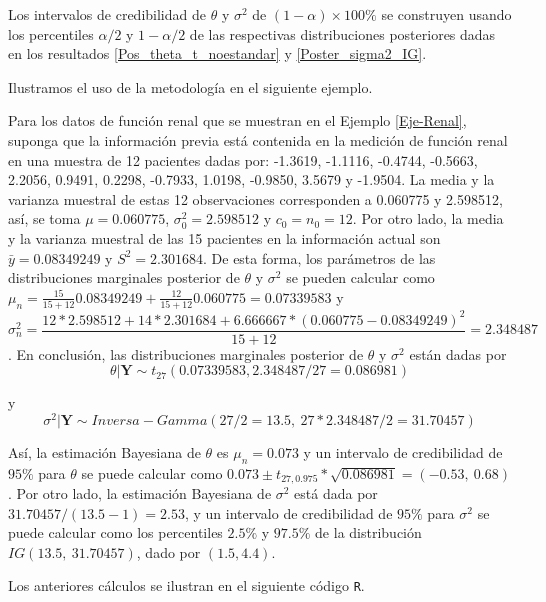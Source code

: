 Los intervalos de credibilidad de $\theta$ y $\sigma^2$ de $(1-\alpha)\times 100\%$ se construyen usando los percentiles $\alpha/2$ y $1-\alpha/2$ de las respectivas distribuciones posteriores dadas en los resultados \ref{Pos_theta_t_noestandar} y \ref{Poster_sigma2_IG}.

Ilustramos el uso de la metodología en el siguiente ejemplo.

\begin{Eje}\label{Eje2.1.2}
Para los datos de función renal \cite{Efronims} que se muestran en el Ejemplo \ref{Eje-Renal}, suponga que la información previa está contenida en la medición de función renal en una muestra de 12 pacientes dadas por: -1.3619, -1.1116, -0.4744, -0.5663, 2.2056, 0.9491, 0.2298, -0.7933, 1.0198, -0.9850, 3.5679 y -1.9504. La media y la varianza muestral de estas 12 observaciones corresponden a 0.060775 y 2.598512, así, se toma $\mu=0.060775$, $\sigma^2_0=2.598512$ y $c_0=n_0=12$. Por otro lado, la media y la varianza muestral de las 15 pacientes en la información actual son $\bar{y}=0.08349249$ y $S^2=2.301684$. De esta forma, los parámetros de las distribuciones marginales posterior de $\theta$ y $\sigma^2$ se pueden calcular como $\mu_n=\frac{15}{15+12}0.08349249+\frac{12}{15+12}0.060775=0.07339583$ y $$\sigma^2_n=\dfrac{12*2.598512+14*2.301684+6.666667*(0.060775-0.08349249)^2}{15+12}=2.348487$$. En conclusión, las distribuciones marginales posterior de $\theta$ y $\sigma^2$ están dadas por
\begin{equation*}
\theta|\mathbf{Y}\sim t_{27}(0.07339583,2.348487/27=0.086981)
\end{equation*}

y
\begin{equation*}
\sigma^2|\mathbf{Y}\sim Inversa-Gamma(27/2=13.5,\ 27*2.348487/2=31.70457)
\end{equation*}

Así, la estimación Bayesiana de $\theta$ es $\mu_n=0.073$ y un intervalo de credibilidad de $95\%$ para $\theta$ se puede calcular como $0.073\pm t_{27,0.975}*\sqrt{0.086981}=(-0.53,\ 0.68)$. Por otro lado, la estimación Bayesiana de $\sigma^2$ está dada por $31.70457/(13.5-1)=2.53$, y un intervalo de credibilidad de $95\%$ para $\sigma^2$ se puede calcular como los percentiles $2.5\%$ y $97.5\%$ de la distribución $IG(13.5,\ 31.70457)$, dado por $(1.5, 4.4)$.

Los anteriores cálculos se ilustran en el siguiente código \verb'R'.
\begin{knitrout}
\color{fgcolor}\begin{kframe}
\begin{alltt}
\end{alltt}



\end{kframe}
\end{knitrout}
\end{Eje}
